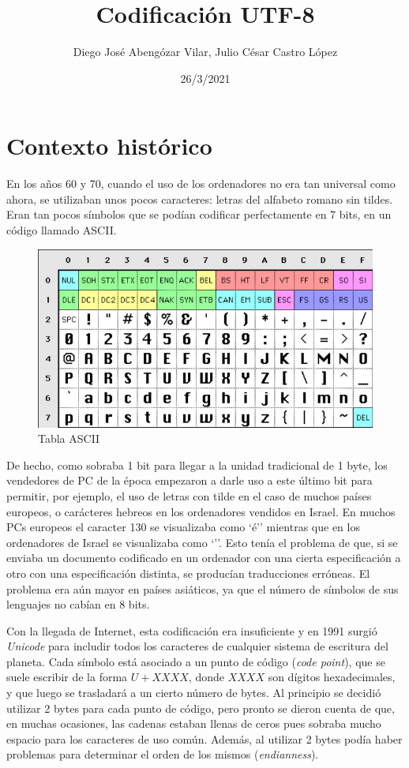 \documentclass{article}
\title{\vspace{-1.7cm}\textbf{Codificación UTF-8}}
\author{Diego José Abengózar Vilar, Julio César Castro López}
\date{26/3/2021}
\begin{document}
\maketitle
\tableofcontents

\section{Contexto histórico}

En los años 60 y 70, cuando el uso de los ordenadores no era tan universal como ahora, se utilizaban unos pocos caracteres: letras del alfabeto romano sin tildes. Eran tan pocos símbolos que se podían codificar perfectamente en 7 bits, en un código llamado ASCII.

\begin{figure}[h]
  \centering
  \includegraphics[scale=0.65]{ascii.jpeg}
  \caption{Tabla ASCII}
\end{figure}

De hecho, como sobraba 1 bit para llegar a la unidad tradicional de 1 byte, los vendedores de PC de la época empezaron a darle uso a este último bit para permitir, por ejemplo, el uso de letras con tilde en el caso de muchos países europeos, o carácteres hebreos en los ordenadores vendidos en Israel. En muchos PCs europeos el caracter 130 se visualizaba como `é'' mientras que en los ordenadores de Israel se visualizaba como `''. Esto tenía el problema de que, si se enviaba un documento codificado en un ordenador con una cierta especificación a otro con una especificación distinta, se producían traducciones erróneas. El problema era aún mayor en países asiáticos, ya que el número de símbolos de sus lenguajes no cabían en 8 bits.

Con la llegada de Internet, esta codificación era insuficiente y en 1991 surgió \textit{Unicode} para includir todos los caracteres de cualquier sistema de escritura del planeta. Cada símbolo está asociado a un punto de código (\textit{code point}), que se suele escribir de la forma $U+XXXX$, donde $XXXX$ son dígitos hexadecimales, y que luego se trasladará a un cierto número de bytes. Al principio se decidió utilizar 2 bytes para cada punto de código, pero pronto se dieron cuenta de que, en muchas ocasiones, las cadenas estaban llenas de ceros pues sobraba mucho espacio para los caracteres de uso común. Además, al utilizar 2 bytes podía haber problemas para determinar el orden de los mismos (\textit{endianness}).
\end{document}

